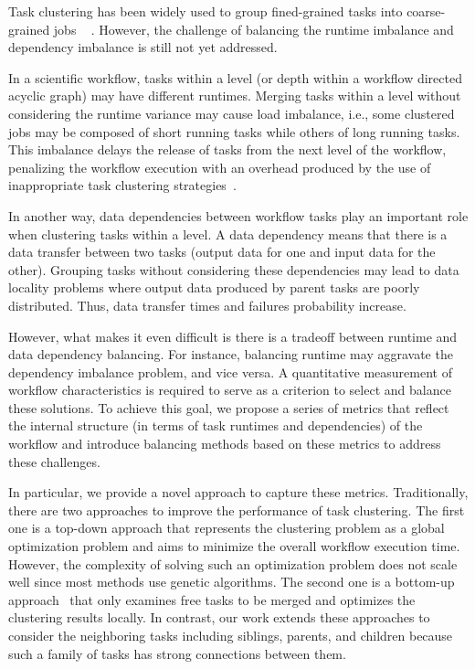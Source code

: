 Task clustering has been widely used to group fined-grained tasks into coarse-grained jobs ~\cite{Muthuvelu:2005:DJG:1082290.1082297, 4493929, Muthuvelu2010, Muthuvelu2013170, keat-2006, ang-2009, 4958835, Silva2013} . However, the challenge of balancing the runtime imbalance and dependency imbalance is still not yet addressed.

In a scientific workflow, tasks within a level (or depth within a workflow directed acyclic graph) may have different runtimes. Merging tasks within a level without considering the runtime variance may cause load imbalance, i.e., some clustered jobs may be composed of short running tasks while others of long running tasks. This imbalance delays the release of tasks from the next level of the workflow, penalizing the workflow execution with an overhead produced by the use of inappropriate task clustering strategies~\cite{Chen2013}.


In another way, data dependencies between workflow tasks play an important role when clustering tasks within a level. A data dependency means that there is a data transfer between two tasks (output data for one and input data for the other). Grouping tasks without considering these dependencies may lead to data locality problems where output data produced by parent tasks are poorly distributed. Thus, data transfer times and failures probability increase.

However, what makes it even difficult is there is a tradeoff between runtime and data dependency balancing. For instance, balancing runtime may aggravate the dependency imbalance problem, and vice versa. A quantitative measurement of workflow characteristics is required to serve as a criterion to select and balance these solutions. To achieve this goal, we propose a series of metrics that reflect the internal structure (in terms of task runtimes and dependencies) of the workflow and introduce balancing methods based on these metrics to address these challenges. 

In particular, we provide a novel approach to capture these metrics. Traditionally, there are two approaches to improve the performance of task clustering. The first one is a top-down approach \cite{6217508} that represents the clustering problem as a global optimization problem and aims to minimize the overall workflow execution time. However, the complexity of solving such an optimization problem does not scale well since most methods use genetic algorithms. The second one is a bottom-up approach~\cite{Muthuvelu:2005:DJG:1082290.1082297,4958835} that only examines free tasks to be merged and optimizes the clustering results locally. In contrast, our work extends these approaches to consider the neighboring tasks including siblings, parents, and children because such a family of tasks has strong connections between them. 



